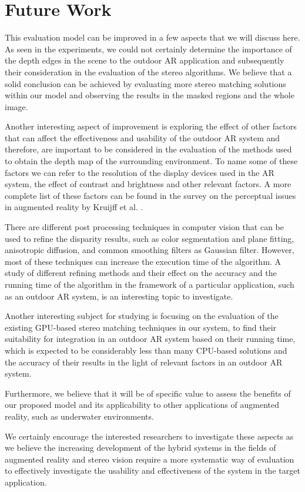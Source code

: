 \section{Future Work}
This evaluation model can be improved in a few aspects that we will discuss here.
As seen in the experiments, we could not certainly determine the importance of the depth edges in the scene to the outdoor AR application and subsequently their consideration in the evaluation 
of the stereo algorithms. We believe that a solid conclusion can be achieved by evaluating more stereo matching solutions
within our model and observing the results in the masked regions and the whole image.

Another interesting aspect of improvement is exploring the effect of other factors that can affect the effectiveness and usability of the outdoor AR system and therefore, 
are important to be considered in the evaluation of the methods used to obtain the depth map of the surrounding environment. To name some of these factors we can refer to
the resolution of the display devices used in the AR system, the effect of contrast and brightness and other relevant factors. A more complete list of these factors can be
found in the survey on the perceptual issues in augmented reality by Kruijff et al. \cite{kru10}.

There are different post processing techniques in computer vision that can be used to refine the disparity results, such as color segmentation and plane fitting, 
anisotropic diffusion, and common smoothing filters as Gaussian filter. However, most of these techniques can increase the execution time of the algorithm.
A study of different refining methods and their effect on the accuracy and the running time of the algorithm in the framework of a particular application, 
such as an outdoor AR system, is an interesting topic to investigate.

Another interesting subject for studying is focusing on the evaluation of the existing GPU-based stereo matching techniques in our system,
to find their suitability for integration in an outdoor AR system based on their running time, which is expected to be considerably less than many CPU-based solutions 
and the accuracy of their results in the light of relevant factors in an outdoor AR system. 

Furthermore, we believe that it will be of specific value to
assess the benefits of our proposed model and its applicability to other applications of augmented reality, such as underwater environments. 

We certainly encourage the 
interested researchers to investigate these aspects as we believe the increasing development of the hybrid systems in the fields of augmented reality and stereo vision 
require a more systematic way of evaluation to effectively investigate the usability and effectiveness of the system in the target application.



